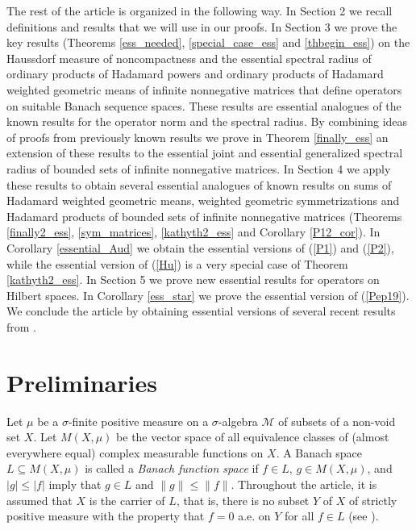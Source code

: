 \documentclass[12pt, reqno]{amsart}
\theoremstyle{definition}
\theoremstyle{remark}
\numberwithin{equation}{section}
\newcommand{\cM}{{\mathcal M}}
\begin{document}
The rest of the article is organized in the following way. In Section 2 we recall definitions and results that we will use in our proofs. %
In Section 3 we prove the key results (Theorems \ref{ess_needed}, \ref{special_case_ess} and \ref{thbegin_ess}) on the Haussdorf measure of noncompactness and the essential spectral radius of ordinary products of Hadamard powers and ordinary products of Hadamard weighted geometric means of infinite nonnegative matrices that define operators on suitable Banach sequence  spaces. These results are essential analogues of the known results for the operator norm and the spectral radius. By combining ideas of proofs from previously known results we prove in Theorem \ref{finally_ess} an extension of these results to the essential joint and essential generalized spectral radius of bounded sets of infinite nonnegative matrices.  In Section 4 we apply these results to obtain several essential analogues of known results on sums of Hadamard weighted geometric means, weighted geometric symmetrizations and Hadamard products of  bounded sets of infinite nonnegative matrices (Theorems \ref{finally2_ess}, \ref{sym_matrices}, \ref{kathyth2_ess} and Corollary \ref{P12_cor}). In Corollary \ref{essential_Aud} we obtain the essential versions of (\ref{P1}) and (\ref{P2}), while the essential version of (\ref{Hu}) is a very special case of Theorem \ref{kathyth2_ess}.  In Section 5 we prove new essential results for operators on Hilbert spaces. In Corollary \ref{ess_star} we prove the essential version of (\ref{Pep19}). We conclude the article by obtaining essential versions of several recent results from \cite{B23+}.





\section{Preliminaries}
\vspace{1mm}

Let $\mu$ be a $\sigma$-finite positive measure on a $\sigma$-algebra $\cM$ of subsets of a non-void set $X$.
Let $M(X,\mu)$ be the vector space of all equivalence classes of (almost everywhere equal)
complex measurable functions on $X$. A Banach space $L \subseteq M(X,\mu)$ is
called a {\it Banach function space} if $f \in L$, $g \in M(X,\mu)$,
and $|g| \le |f|$ imply that $g \in L$ and $\|g\| \le \|f\|$. Throughout the article, it is assumed that  $X$ is the carrier of $L$, that is, there is no subset $Y$ of $X$ of
 strictly positive measure with the property that $f = 0$ a.e. on $Y$ for all $f \in L$ (see \cite{Za83}).
\end{document}
